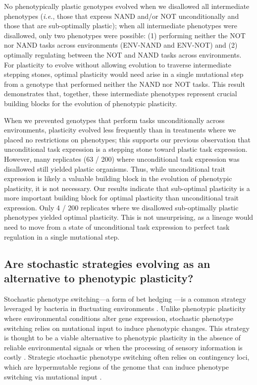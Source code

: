 No phenotypically plastic genotypes evolved when we disallowed all intermediate phenotypes (\textit{i.e.}, those that express NAND and/or NOT unconditionally and those that are sub-optimally plastic); when all intermediate phenotypes were disallowed, only two phenotypes were possible: (1) performing neither the NOT nor NAND tasks across environments (ENV-NAND and ENV-NOT) and (2) optimally regulating between the NOT and NAND tasks across environments.
For plasticity to evolve without allowing evolution to traverse intermediate stepping stones, optimal plasticity would need arise in a single mutational step from a genotype that performed neither the NAND nor NOT tasks.
This result demonstrates that, together, these intermediate phenotypes represent crucial building blocks for the evolution of phenotypic plasticity. 

When we prevented genotypes that perform tasks unconditionally across environments, plasticity evolved less frequently than in treatments where we placed no restrictions on phenotypes; this supports our previous observation that unconditional task expression is a stepping stone toward plastic task expression. However, many replicates (63 / 200) where unconditional task expression was disallowed still yielded plastic organisms. Thus, while unconditional trait expression is likely a valuable building block in the evolution of phenotypic plasticity, it is not necessary. Our results indicate that sub-optimal plasticity is a more important building block for optimal plasticity than unconditional trait expression. Only 4 / 200 replicates where we disallowed sub-optimally plastic phenotypes yielded optimal plasticity. This is not unsurprising, as a lineage would need to move from a state of unconditional task expression to perfect task regulation in a single mutational step.

\subsection{Are stochastic strategies evolving as an alternative to phenotypic plasticity?}

Stochastic phenotype switching---a form of bet hedging \citep{seger_what_1987}---is a common strategy leveraged by bacteria in fluctuating environments \citep{rainey_evolutionary_2011}. 
Unlike phenotypic plasticity where environmental conditions alter gene expression, stochastic phenotype switching relies on mutational input to induce phenotypic changes. 
This strategy is thought to be a viable alternative to phenotypic plasticity in the absence of reliable environmental signals or when the processing of sensory information is costly \citep{rainey_evolutionary_2011}.
Strategic stochastic phenotype switching often relies on contingency loci, which are hypermutable regions of the genome that can induce phenotype switching via mutational input \citep{moxon_bacterial_2006}. 

